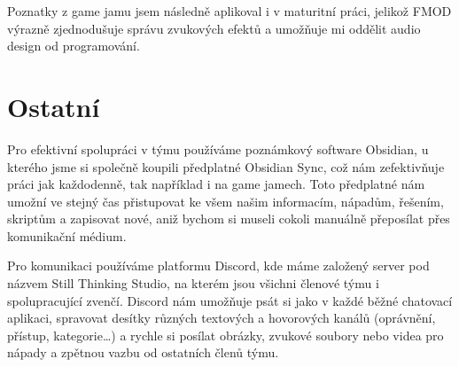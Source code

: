 Poznatky z game jamu jsem následně aplikoval i v maturitní práci, jelikož FMOD výrazně zjednodušuje správu zvukových efektů a umožňuje mi oddělit audio design od programování.

\section{Ostatní}
Pro efektivní spolupráci v týmu používáme poznámkový software Obsidian, u kterého jsme si společně koupili předplatné Obsidian Sync, což nám zefektivňuje práci jak každodenně, tak například i na game jamech. Toto předplatné nám umožní ve stejný čas přistupovat ke všem našim informacím, nápadům, řešením, skriptům a zapisovat nové, aniž bychom si museli cokoli manuálně přeposílat přes komunikační médium.

Pro komunikaci používáme platformu Discord, kde máme založený server pod názvem Still Thinking Studio, na kterém jsou všichni členové týmu i spolupracující zvenčí. Discord nám umožňuje psát si jako v každé běžné chatovací aplikaci, spravovat desítky různých textových a hovorových kanálů (oprávnění, přístup, kategorie…) a rychle si posílat obrázky, zvukové soubory nebo videa pro nápady a zpětnou vazbu od ostatních členů týmu.